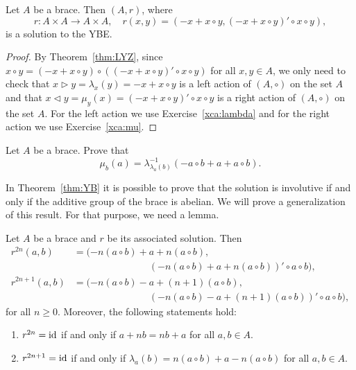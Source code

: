 \begin{theorem}
\label{thm:YB}
Let $A$ be a brace. Then 
$(A,r)$, where 
\[
r\colon A\times A\to A\times A,\quad
r(x,y)=( -x+x\circ y,(-x+x\circ y)'\circ x\circ y),
\]
is a solution to the YBE. 
\end{theorem}

\begin{proof}
    By Theorem~\ref{thm:LYZ}, 
    since $x\circ y=(-x+x\circ y)\circ ((-x+x\circ y)'\circ x\circ y)$ for all $x,y\in A$, 
    we only need to check that 
    $x\rhd y=\lambda_x(y)=-x+x\circ y$ 
    is a left action of $(A,\circ)$ on the set $A$ 
    and that $x\lhd y=\mu_y(x)=(-x+x\circ y)'\circ x\circ y$ 
    is a right action of $(A,\circ)$ on the set $A$. For the left action we use 
    Exercise~\ref{xca:lambda} and for the right action we use Exercise~\ref{xca:mu}.
\end{proof}

\begin{exercise}
Let $A$ be a brace. 
Prove that 
\[
\mu_b(a)=\lambda^{-1}_{\lambda_a(b)}(-a\circ b+a+a\circ b).
\]
\end{exercise}

In Theorem~\ref{thm:YB} it is possible to prove that the solution 
is involutive if and only if the additive group of the brace is abelian. We will
prove a generalization of this result. For that purpose, we need a lemma. 

\begin{lemma}
\label{lem:|r|}
Let $A$ be a brace and $r$ be its associated solution.  Then
  \begin{align} 
  \nonumber
  r^{2n}(a,b)&=(-n(a\circ b)+a+n(a\circ
    b),\\
    \label{eq:r^2n}
    &\phantom{=(-n(a\circ b)+}(-n(a\circ b)+a+n(a\circ b))'\circ a\circ b),\\
  \nonumber
  r^{2n+1}(a,b)&=(-n(a\circ b)-a+(n+1)(a\circ
    b),\\
    \label{eq:r^2n+1}
    &\phantom{=(-n(a\circ b)+}(-n(a\circ b)-a+(n+1)(a\circ b))'\circ a\circ b),
    \end{align} 
    for all $n\geq0$.  Moreover, the following statements hold:
  \begin{enumerate} 
  \item $r^{2n}=\operatorname{id}$ if and only if $a+nb=nb+a$ for all $a,b\in A$.  
      \item $r^{2n+1}=\operatorname{id}$ if and only if $\lambda_a(b)=n(a\circ
	b)+a-n(a\circ b)$ for all $a,b\in A$.  
	\end{enumerate} 
\end{lemma}

